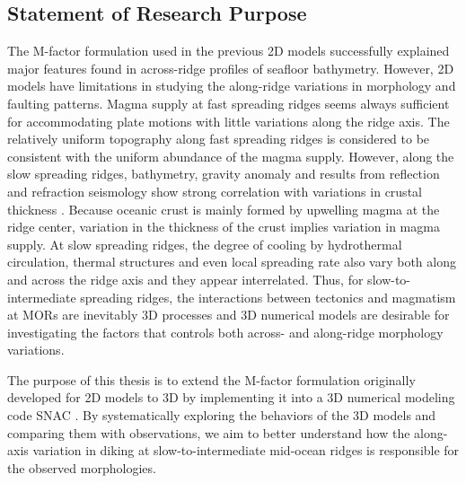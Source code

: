 \subsection{Statement of Research Purpose}

The M-factor formulation used in the previous 2D models \citep[e.g.,][]{Tucholke2008,Buck2005} successfully explained major features found in across-ridge profiles of seafloor bathymetry. However, 2D models have limitations in studying the along-ridge variations in morphology and faulting patterns. Magma supply at fast spreading ridges seems always sufficient for accommodating plate motions with little variations along the ridge axis. The relatively uniform topography along fast spreading ridges is considered to be consistent with the uniform abundance of the magma supply. However, along the slow spreading ridges, bathymetry, gravity anomaly and results from reflection and refraction seismology show strong correlation with variations in crustal thickness \citep[e.g.,][]{Ryan2009, Chen1999, Lin1990, Tolstoy1993}. Because oceanic crust is mainly formed by upwelling magma at the ridge center, variation in the thickness of the crust implies variation in magma supply. At slow spreading ridges, the degree of cooling by hydrothermal circulation, thermal structures and even local spreading rate \citep{Baines2008} also vary both along and across the ridge axis and they appear interrelated. Thus, for slow-to-intermediate spreading ridges, the interactions between tectonics and magmatism at MORs are inevitably 3D processes and 3D numerical models are desirable for investigating the factors that controls both across- and along-ridge morphology variations. 

The purpose of this thesis is to extend the M-factor formulation originally developed for 2D models to 3D by implementing it into a 3D numerical modeling code SNAC %
\citep{Choi2008}. By systematically exploring the behaviors of the 3D models and comparing them with observations, we aim to better understand how the along-axis variation in diking at slow-to-intermediate mid-ocean ridges is responsible for the observed morphologies.

